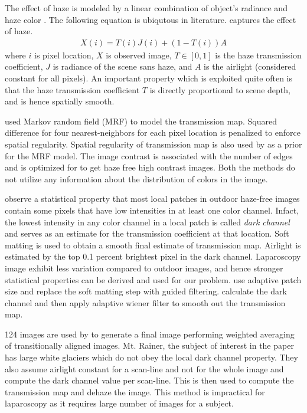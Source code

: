 The effect of haze is modeled by a linear combination of object's radiance and haze color \cite{koschmieder1925smokemodel}. The following equation is ubiqutous in literature.  captures the effect of haze.
\begin{align}
    X(i) = T(i) J(i) + (1 - T(i)) A \label{eqn:hazemodel}
\end{align}
where $i$ is pixel location, $X$ is observed image, $T \in [0, 1]$ is the haze transmission coefficient, $J$ is radiance of the scene sans haze, and $A$ is the airlight (considered constant for all pixels). An important property which is exploited quite often is that the haze transmission coefficient $T$ is directly proportional to scene depth, and is hence spatially smooth.

\cite{fattal2008single} used Markov random field (MRF) to model the transmission map. Squared difference for four nearest-neighbors for each pixel location is penalized to enforce spatial regularity. Spatial regularity of transmission map is also used by \cite{tan2008visibility} as a prior for the MRF model. The image contrast is associated with the number of edges and is optimized for to get haze free high contrast images. Both the methods do not utilize any information about the distribution of colors in the image.

\cite{he2011dark} observe a statistical property that most local patches in outdoor haze-free images contain some pixels that have low intensities in at least one color channel. Infact, the lowest intensity in any color channel in a local patch is called \textit{dark channel} and serves as an estimate for the transmission coefficient at that location. Soft matting is used to obtain a smooth final estimate of transmission map. Airlight is estimated by the top 0.1 percent brightest pixel in the dark channel. Laparoscopy image exhibit less variation compared to outdoor images, and hence stronger statistical properties can be derived and used for our problem. \cite{pang2011improved} use adaptive patch size and replace the soft matting step with guided filtering. \cite{gibson2013wiener} calculate the dark channel and then apply adaptive wiener filter to smooth out the transmission map. 

124 images are used by \cite{joshi2010multi} to generate a final image performing weighted averaging of transitionally aligned images. Mt. Rainer, the subject of interest in the paper has large white glaciers which do not obey the local dark channel property. They also assume airlight constant for a scan-line and not for the whole image and compute the dark channel value per scan-line. This is then used to compute the transmission map and dehaze the image. This method is impractical for laparoscopy as it requires large number of images for a subject. 

